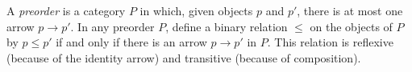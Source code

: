 A \emph{preorder} is a category $P$ in which, given objects $p$ and $p'$, there is at most one arrow $p \to p'$. In any preorder $P$, define a binary relation $\leq$ on the objects of $P$ by $p \leq p'$ if and only if there is an arrow $p \to p'$ in $P$. This relation is reflexive (because of the identity arrow) and transitive (because of composition).
